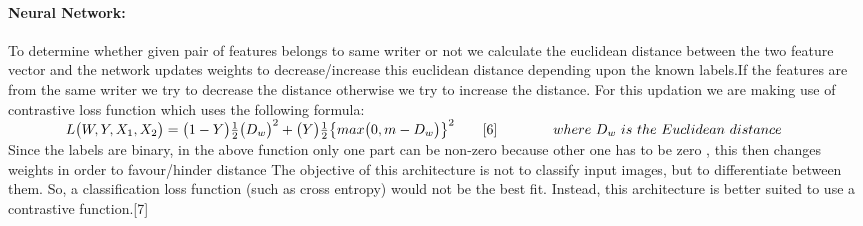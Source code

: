 \documentclass{article}
\begin{document}
\paragraph{Neural Network:\\}To determine whether given pair of features belongs to same writer or not we calculate the euclidean distance between the two feature vector and the network updates weights to decrease/increase this euclidean distance depending upon the known labels.If the features are from the same writer we try to decrease the distance otherwise we try to increase the distance.
For this updation we are making use of contrastive loss function which uses the following formula:\\

\begin{math}
\qquad \qquad L\big(W,Y,X_1,X_2\big)=\big(1-Y\big)\frac{1}{2}\big(D_w\big)^2 + \big(Y\big)\frac{1}{2}\big\{max\big(0,m- D_w\big)\big\}^2    \qquad[6]\\
\qquad \qquad  where\  D_w\  is\  the\  Euclidean\  distance\\
\end{math}\\
Since the labels are binary, in the above function only one part can be non-zero because other one has to be zero , this then changes weights in order to favour/hinder distance The objective of this architecture is not to classify input images, but to differentiate between them. So, a classification loss function (such as cross entropy) would not be the best fit. Instead, this architecture is better suited to use a contrastive function.[7] 
\end{document}
